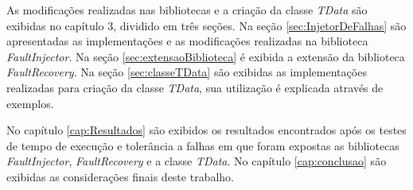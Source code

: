 As modificações realizadas nas bibliotecas e a criação da classe \textit{TData} são exibidas no capítulo 3, dividido em três seções. Na seção \ref{sec:InjetorDeFalhas} são apresentadas as implementações e as modificações realizadas na biblioteca \textit{FaultInjector}. Na seção \ref{sec:extensaoBiblioteca} é exibida a extensão da biblioteca \textit{FaultRecovery}.  Na seção \ref{sec:classeTData} são exibidas as implementações realizadas para criação da classe \textit{TData}, sua utilização é explicada através de exemplos.

No capítulo \ref{cap:Resultados} são exibidos os resultados encontrados após os testes de tempo de execução e tolerância a falhas em que foram expostas as bibliotecas \textit{FaultInjector}, \textit{FaultRecovery} e a classe \textit{TData}. No capítulo \ref{cap:conclusao} são exibidas as considerações finais deste trabalho.


